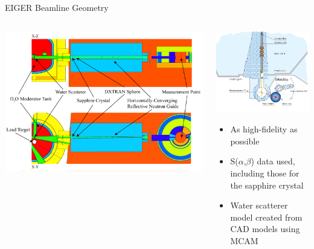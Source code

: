 \documentclass[final,t]{beamer}
\begin{document}
\begin{frame}{}
\begin{columns}[t]
\begin{column}{.3\linewidth}
\begin{block}{EIGER Beamline Geometry}
\begin{columns}[T]
\begin{column}{.75\linewidth}
        \includegraphics*[width=\linewidth]{geom.pdf}
        
        \end{column}
          \begin{column}{.25\linewidth}

          \begin{center}
          \includegraphics*[width=\linewidth]{eiger_lr.png}
          \end{center}

          \begin{itemize} 
          \item As high-fidelity as possible
          \item S($\alpha$,$\beta$) data used, including those for the sapphire crystal \cite{sapp}
          \item Water scatterer model created from CAD models using MCAM \cite{mcam}
          \end{itemize}


\end{column}
\end{columns}
\end{block}
\end{column}
\end{columns}
\end{frame}
\end{document}
